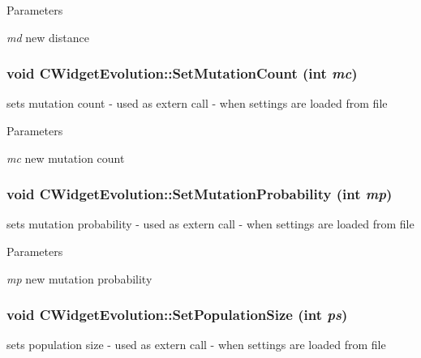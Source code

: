\begin{DoxyParams}{Parameters}
\item[{\em md}]new distance \end{DoxyParams}
\hypertarget{classCWidgetEvolution_a568011dcfe6bdb00e24eca8b905dc486}{
\subsubsection[{SetMutationCount}]{\setlength{\rightskip}{0pt plus 5cm}void CWidgetEvolution::SetMutationCount (int {\em mc})}}
\label{classCWidgetEvolution_a568011dcfe6bdb00e24eca8b905dc486}
sets mutation count -\/ used as extern call -\/ when settings are loaded from file


\begin{DoxyParams}{Parameters}
\item[{\em mc}]new mutation count \end{DoxyParams}
\hypertarget{classCWidgetEvolution_ab4f774d3c732bab25a981cf09690c279}{
\subsubsection[{SetMutationProbability}]{\setlength{\rightskip}{0pt plus 5cm}void CWidgetEvolution::SetMutationProbability (int {\em mp})}}
\label{classCWidgetEvolution_ab4f774d3c732bab25a981cf09690c279}
sets mutation probability -\/ used as extern call -\/ when settings are loaded from file


\begin{DoxyParams}{Parameters}
\item[{\em mp}]new mutation probability \end{DoxyParams}
\hypertarget{classCWidgetEvolution_a75cdaa493580c52f979f91c37f55e288}{
\subsubsection[{SetPopulationSize}]{\setlength{\rightskip}{0pt plus 5cm}void CWidgetEvolution::SetPopulationSize (int {\em ps})}}
\label{classCWidgetEvolution_a75cdaa493580c52f979f91c37f55e288}
sets population size -\/ used as extern call -\/ when settings are loaded from file


